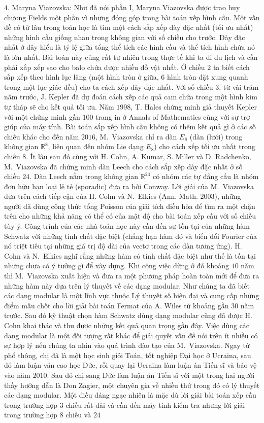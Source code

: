 \begin{multicols}{2}
	\vskip 0.05cm
	$4.$ Maryna Viazovska: Như đã nói phần I, Maryna Viazovska được trao huy chương Fields một phần vì những đóng góp trong bài toán xếp hình cầu.
	\vskip 0.05cm
	Một vấn đề có từ lâu trong toán học là tìm một cách sắp xếp dày đặc nhất (tối ưu nhất) những hình cầu giống nhau trong không gian với số chiều cho trước. Dày đặc nhất ở đây hiểu là tỷ lệ giữa tổng thể tích các hình cầu và thể tích hình chứa nó là lớn nhất. Bài toán này cũng rất tự nhiên trong thực tế khi ta đi du lịch và cần phải xắp xếp sao cho balo chứa được nhiều đồ vật nhất. Ở chiều $2$ ta biết cách sắp xếp theo hình lục lăng (một hình tròn ở giữa, $6$ hình tròn đặt xung quanh trong một lục giác đều) cho ta cách xếp dày đặc nhất. Với số chiều $3$, từ vài trăm năm trước, J. Kepler đã dự đoán cách xếp các quả cam chứa trong một hình kim tự tháp sẽ cho kết quả tối ưu. Năm $1998$, T. Hales chứng minh giả thuyết Kepler với một chứng minh gần $100$ trang in ở Annals of Mathematics cùng với sự trợ giúp của máy tính. Bài toán sắp xếp hình cầu không có thêm kết quả gì ở các số chiều khác cho đến năm $2016$, M.~Viazovska chỉ ra dàn $E_{8}$ (dàn (lưới) trong không gian $\mathbb{R}^8$, liên quan đến nhóm Lie dạng $E_{8}$) cho cách xếp tối ưu nhất trong chiều $8$. Ít lâu sau đó cùng với H. Cohn, A. Kumar, S. Miller và D. Radchenko, M.~Viazovska đã chứng minh dàn Leech cho cách sắp xếp dày đặc nhất ở số chiều $24$. Dàn Leech nằm trong không gian $\mathbb{R}^{24}$ có nhóm các tự đẳng cấu là nhóm đơn hữu hạn loại lẻ tẻ (sporadic) đưa ra bởi Conway. Lời giải của M.~Viazovska dựa trên cách tiếp cận của H. Cohn và N.~Elkies (Ann. Math. $2003$), những người đã dùng công thức tổng Poisson của giải tích điều hòa để tìm ra một chặn trên cho những khả năng có thể có của mật độ cho bài toán xếp cầu với số chiều tùy ý. Công trình của các nhà toán học này cần đến sự tồn tại của những hàm Schwatz với những tính chất đặc biệt (chẳng hạn hàm đó và biến đổi Fourier của nó triệt tiêu tại những giá trị độ dài của vectơ trong các dàn tương ứng). H. Cohn và N.~Elkies nghĩ rằng những hàm có tính chất đặc biệt như thế là tồn tại nhưng chưa có ý tưởng gì để xây dựng. Khi công việc dừng ở đó khoảng $10$ năm thì M.~Viazovska xuất hiện và đưa ra một phương pháp hoàn toàn mới để đưa ra những hàm này dựa trên lý thuyết về các dạng modular. Như chúng ta đã biết các dạng modular là một lĩnh vực thuộc Lý thuyết số hiện đại và cung cấp những điểm mấu chốt cho lời giải bài toán Fermat của A. Wiles từ khoảng gần $30$ năm trước. Sau đó kỹ thuật chọn hàm Schwatz dùng dạng modular cũng đã được H. Cohn khai thác và thu được những kết quả quan trọng gần đây. Việc dùng các dạng modular là một đối tượng rất khác để giải quyết vấn đề nói trên ít nhiều có sự hợp lý nếu chúng ta nhìn vào quá trình đào tạo của M.~Viazovska. Ngay từ phổ thông, chị đã là một học sinh giỏi Toán, tốt nghiệp Đại học ở Ucraina, sau đó làm luận văn cao học Đức, rồi quay lại Ucraina làm luận án Tiến sĩ và bảo vệ vào năm $2010$. Sau đó chị sang Đức làm luận án Tiến sĩ với một trong hai người thầy hướng dẫn là Don Zagier, một chuyên gia về nhiều thứ trong đó có lý thuyết các dạng modular. Một điều đáng ngạc nhiên là mặc dù lời giải bài toán xếp cầu trong trường hợp $3$ chiều rất dài và cần đến máy tính kiểm tra nhưng lời giải trong trường hợp $8$ chiều và $24$ 
\end{multicols}
